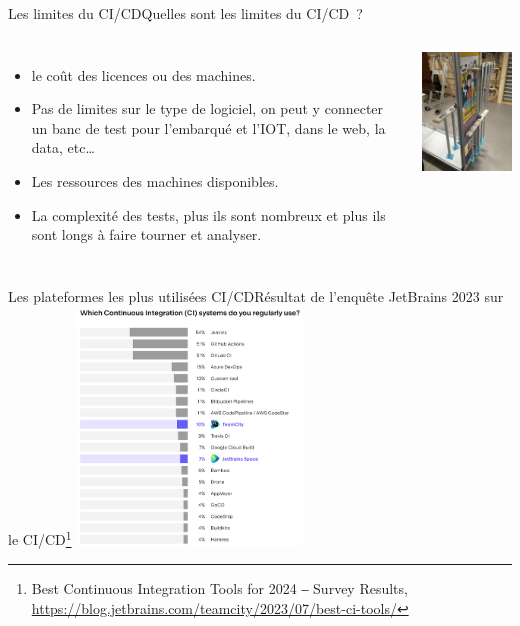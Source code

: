 \documentclass{beamer}
\begin{document}
    \begin{frame}{Les limites du CI/CD}{Quelles sont les limites du CI/CD~?}
        \transdissolve
        \pause
        \begin{columns}
            \begin{itemize}
                \item le coût des licences ou des machines.
                \item Pas de limites sur le type de logiciel, on peut y connecter un banc de test pour l'embarqué et l'IOT, dans le web, la data, etc\ldots
                \item Les ressources des machines disponibles.
                \item La complexité des tests, plus ils sont nombreux et plus ils sont longs à faire tourner et analyser.
            \end{itemize}
            \centering
            \includegraphics[width=5cm]{image/somfy-test-bench}
        \end{columns}
    \end{frame}

    \begin{frame}{Les plateformes les plus utilisées CI/CD}{Résultat de l'enquête JetBrains 2023 sur le CI/CD\footnote{Best Continuous Integration Tools for 2024 ‒ Survey Results, \url{https://blog.jetbrains.com/teamcity/2023/07/best-ci-tools/}}}
        \transdissolve
        \centering
        \includegraphics[width=6cm]{image/ci-jetbrains-survey}
    \end{frame}
\end{document}
